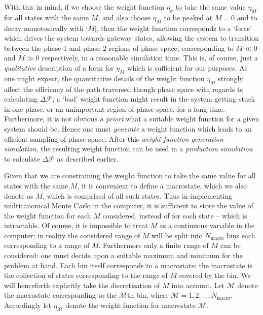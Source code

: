 \documentclass{report}
\begin{document}
With this in mind, if we choose the weight function $\eta_{\sigma}$ to take the same value $\eta_{M}$ 
for all states with the same $M$, and also choose $\eta_{M}$ to be peaked at $M=0$ and to decay monotonically with 
$|M|$, then the weight function corresponds to a `force' which drives the system towards gateway states, allowing the system to transition between
the phase-1 and phase-2 regions of phase space, corresponding to $M\ll 0$ and $M\gg 0$ respectively, in a reasonable simulation time.
This is, of course, just a \emph{qualitative} description of a form for $\eta_{M}$ which is sufficient for our purposes. As one might expect, 
the quantitative details of the weight function $\eta_{M}$ strongly affect the efficiency of the path traversed though phase space with regards 
to calculating $\Delta \mathcal{F}$; a `bad' weight function might result in the system getting stuck in one phase, or an unimportant region of phase 
space, for a long time. Furthermore, it is not obvious \emph{a priori} what a suitable weight function for a given system should be. Hence one must 
\emph{generate} a weight function which leads to an efficient sampling of phase space. After this \emph{weight function generation simulation},
the resulting weight function can be used in a \emph{production simulation} to calculate $\Delta \mathcal{F}$ as described earlier.

Given that we are constraining the weight function to take the same value for all states with the same $M$, it is convenient to define a
macrostate, which we also denote as $M$, which is comprised of all such states. Thus in implementing multicanonical Monte Carlo
in the computer, it is sufficient to store the value of the weight function for each $M$ considered, instead of for each state -- which is
intractable. Of course, it is impossible to treat $M$ as a continuous variable in the computer; in reality the considered range of $M$ will
be split into $N_{\text{macro}}$ bins each corresponding to a range of $M$. Furthermore only a finite range of $M$ can be considered: one must
decide upon a suitable maximum and minimum for the problem at hand. Each bin itself corresponds to a macrostate: the macrostate is the
collection of states corresponding to the range of $M$ covered by the bin. We will henceforth explicitly take the discretisation of $M$ into
account. Let $\mathcal{M}$ denote the macrostate corresponding to the $\mathcal{M}$th bin, where $\mathcal{M}=1,2,\dotsc,N_{\text{macro}}$.
Accordingly let $\eta_{\mathcal{M}}$ denote the weight function for macrostate $\mathcal{M}$. 
\end{document}
